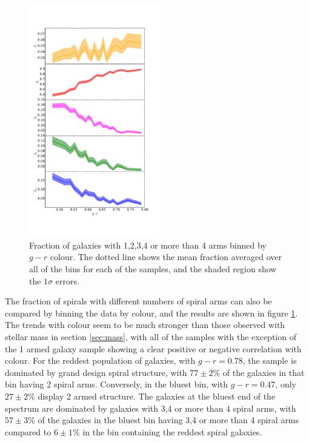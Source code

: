 \documentclass[useAMS,usenatbib]{mn2e}
\begin{document}
\begin{figure}
		\centering

        \includegraphics[width=0.5\textwidth]{Data_imgs/colour_plot.pdf}

        \caption{Fraction of galaxies with 1,2,3,4 or more than 4 arms binned by $g-r$ colour. The dotted line shows the mean fraction averaged over all of the bins for each of the samples, and the shaded region show the $1 \sigma$ errors.}

        \label{fig:colour_plot}

\end{figure}

The fraction of spirals with different numbers of spiral arms can also be compared by binning the data by colour, and the results are shown in figure \ref{fig:colour_plot}. The trends with colour seem to be much stronger than those observed with stellar mass in section \ref{sec:mass}, with all of the samples with the exception of the 1 armed galaxy sample showing a clear positive or negative correlation with colour. For the reddest population of galaxies, with $g-r=0.78$, the sample is dominated by grand design spiral structure, with $77 \pm 2 \%$ of the galaxies in that bin having 2 spiral arms. Conversely, in the bluest bin, with $g-r=0.47$, only $27 \pm 2 \%$ display 2 armed structure. The galaxies at the bluest end of the spectrum are dominated by galaxies with 3,4 or more than 4 spiral arms, with $57 \pm 3 \%$ of the galaxies in the bluest bin having 3,4 or more than 4 spiral arms compared to $6 \pm 1 \%$ in the bin containing the reddest spiral galaxies.
\end{document}
